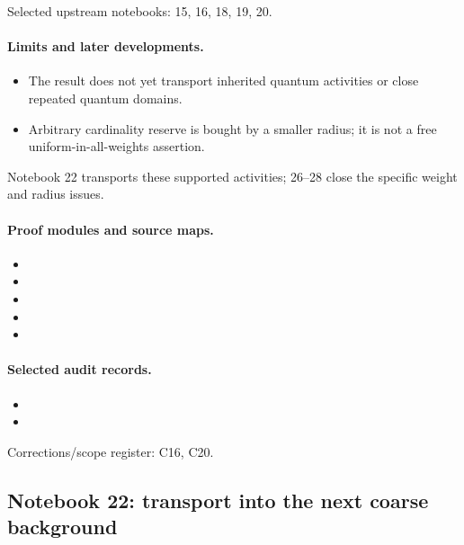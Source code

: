 Selected upstream notebooks: 15, 16, 18, 19, 20.\par

\paragraph{Limits and later developments.}
\begin{itemize}
\item The result does not yet transport inherited quantum activities or close repeated quantum domains.
\item Arbitrary cardinality reserve is bought by a smaller radius; it is not a free uniform-in-all-weights assertion.
\end{itemize}

Notebook 22 transports these supported activities; 26--28 close the specific weight and radius issues.

\paragraph{Proof modules and source maps.}
\begingroup\small
\begin{itemize}
\item {}
\item {}
\item {}
\item {}
\item {}
\end{itemize}
\endgroup

\paragraph{Selected audit records.}
\begingroup\small
\begin{itemize}
\item {}
\item {}
\end{itemize}
\endgroup
Corrections/scope register: C16, C20.\par

\subsection{Notebook 22: transport into the next coarse background}
\label{hnc-22}
\noindent{}\par

